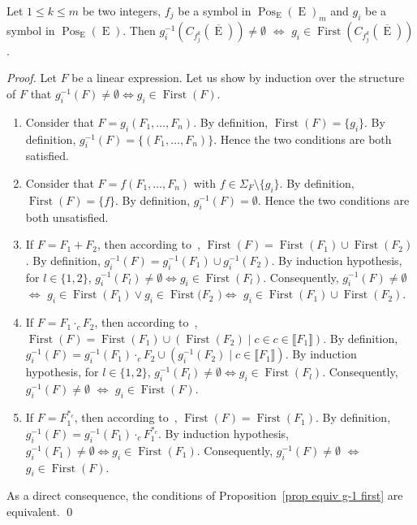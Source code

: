 \documentclass{llncs}
\def\Po#1#2{\Pos_{#1}{(#2)}}
\DeclareMathOperator{\E}{E}
\DeclareMathOperator{\First}{First}
\DeclareMathOperator{\Pos}{Pos}
\def\b#1{\overline{#1}}
\begin{document}
\begin{proposition}\label{prop equiv g-1 first}
Let $1\leq k\leq m$ be two integers, $f_j$ be a symbol in $\Po{\E}{\E}_m$ and $g_i$ be a symbol in $\Po{\E}{\E}$. Then $g_i^{-1}(C_{f^k_j}(\b \E))\neq\emptyset$ $\Leftrightarrow$ $g_i \in \First(C_{f^k_j}(\b \E))$.
\end{proposition}
\begin{proof}
  Let $F$ be a linear expression. Let us show by induction over the structure of $F$ that $g_i^{-1}(F)\neq\emptyset \Leftrightarrow g_i \in \First(F)$.
  \begin{enumerate}
    \item Consider that $F=g_i(F_1,\ldots,F_n)$. By definition, $\First(F)=\{g_i\}$. By definition, $g_i^{-1}(F)=\{(F_1,\ldots,F_n)\}$. Hence the two conditions are both satisfied.
    \item Consider that $F=f(F_1,\ldots,F_n)$ with $f\in\Sigma_F\setminus\{ g_i\}$. By definition, $\First(F)=\{f\}$. By definition, $g_i^{-1}(F)=\emptyset$. Hence the two conditions are both unsatisfied.
    \item If $F=F_1+F_2$, then according to~\cite{lata}, $\First(F)=\First(F_1)\cup \First(F_2)$. By definition, $g_i^{-1}(F)=g_i^{-1}(F_1)\cup g_i^{-1}(F_2)$. By induction hypothesis, for $l\in\{1,2\}$, $g_i^{-1}(F_l)\neq\emptyset \Leftrightarrow g_i \in \First(F_l)$. Consequently, $g_i^{-1}(F)\neq\emptyset$ $\Leftrightarrow$ $g_i \in \First(F_1)\vee g_i \in \First(F_2$ $)\Leftrightarrow$ $g_i \in \First(F_1)\cup\First(F_2)$.
    \item If $F=F_1\cdot_c F_2$, then according to~\cite{lata}, $\First(F)=\First(F_1)\cup (\First(F_2)\mid c\in c\in\llbracket F_1\rrbracket)$. By definition, $g_i^{-1}(F)=g_i^{-1}(F_1)\cdot_c F_2\cup (g_i^{-1}(F_2)\mid c\in\llbracket F_1\rrbracket)$. By induction hypothesis, for $l\in\{1,2\}$, $g_i^{-1}(F_l)\neq\emptyset \Leftrightarrow g_i \in \First(F_l)$. Consequently, $g_i^{-1}(F)\neq\emptyset$ $\Leftrightarrow$ $g_i \in \First(F)$.
    \item If $F=F_1^{*_c}$, then according to~\cite{lata}, $\First(F)=\First(F_1)$. By definition, $g_i^{-1}(F)=g_i^{-1}(F_1)\cdot_c F_1^{*_c}$. By induction hypothesis, $g_i^{-1}(F_1)\neq\emptyset \Leftrightarrow g_i \in \First(F_1)$. Consequently, $g_i^{-1}(F)\neq\emptyset$ $\Leftrightarrow$ $g_i \in \First(F)$.
  \end{enumerate}  
  As a direct consequence, the conditions of Proposition~\ref{prop equiv g-1 first} are equivalent.
  \qed
\end{proof} 
\end{document}
